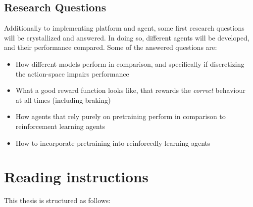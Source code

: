 \subsection{Research Questions}

Additionally to implementing platform and agent, some first research questions will be crystallized and answered. In doing so, different agents will be developed, and their performance compared. Some of the answered questions are:
\begin{itemize}
	\item How different models perform in comparison, and specifically if discretizing the action-space impairs performance
	\item What a good reward function looks like, that rewards the \textit{correct} behaviour at all times (including braking)
	\item How agents that rely purely on pretraining perform in comparison to reinforcement learning agents
	\item How to incorporate pretraining into reinforcedly learning agents
\end{itemize}

\section{Reading instructions}

This thesis is structured as follows:


